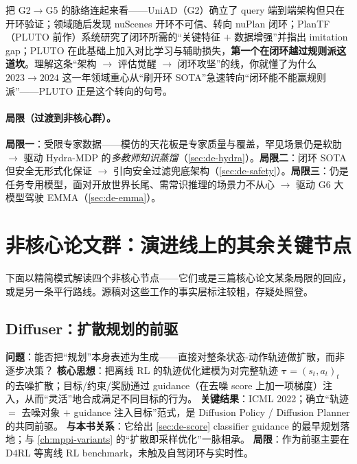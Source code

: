 \begin{insight}
把 G2$\to$G5 的脉络连起来看——UniAD（G2）确立了 query 端到端架构但只在开环验证；领域随后发现 nuScenes 开环不可信、转向 nuPlan 闭环；PlanTF（PLUTO 前作）系统研究了闭环所需的“关键特征 $+$ 数据增强”并指出 imitation gap；PLUTO 在此基础上加入对比学习与辅助损失，\textbf{第一个在闭环越过规则派这道坎}。理解这条“架构 $\to$ 评估觉醒 $\to$ 闭环攻坚”的线，你就懂了为什么 $2023\to2024$ 这一年领域重心从“刷开环 SOTA”急速转向“闭环能不能赢规则派”——PLUTO 正是这个转向的句号。
\end{insight}

\paragraph{局限（过渡到非核心群）。}
\textbf{局限一}：受限专家数据——模仿的天花板是专家质量与覆盖，罕见场景仍是软肋 $\to$ 驱动 Hydra-MDP 的\emph{多教师知识蒸馏}（\cref{sec:de-hydra}）。\textbf{局限二}：闭环 SOTA 但安全无形式化保证 $\to$ 引向安全过滤兜底架构（\cref{sec:de-safety}）。\textbf{局限三}：仍是任务专用模型，面对开放世界长尾、需常识推理的场景力不从心 $\to$ 驱动 G6 大模型驾驶 EMMA（\cref{sec:de-emma}）。

\section{非核心论文群：演进线上的其余关键节点}
\label{sec:de-rest}

下面以精简模式解读四个非核心节点——它们或是三篇核心论文某条局限的回应，或是另一条平行路线。源稿对这些工作的事实层标注较粗，存疑处照登。

\subsection{Diffuser：扩散规划的前驱}
\label{sec:de-diffuser}

\begin{paper}\label{paper:de-diffuser}
\textbf{问题}：能否把“规划”本身表述为生成——直接对整条状态-动作轨迹做扩散，而非逐步决策？
\textbf{核心思想}\cite{janner2022diffuser}：把离线 RL 的轨迹优化建模为对完整轨迹 $\boldsymbol{\tau}=(s_t,a_t)_{t}$ 的去噪扩散；目标/约束/奖励通过 guidance（在去噪 score 上加一项梯度）注入，从而“灵活”地合成满足不同目标的行为。
\textbf{关键结果}：ICML 2022；确立“轨迹 $=$ 去噪对象 $+$ guidance 注入目标”范式，是 Diffusion Policy / Diffusion Planner 的共同前驱。
\textbf{与本书关系}：它给出 \cref{sec:de-score} classifier guidance 的最早规划落地；与 \cref{ch:mppi-variants} 的“扩散即采样优化”一脉相承。
\textbf{局限}：作为前驱主要在 D4RL 等离线 RL benchmark，未触及自驾闭环与实时性。
\end{paper}


